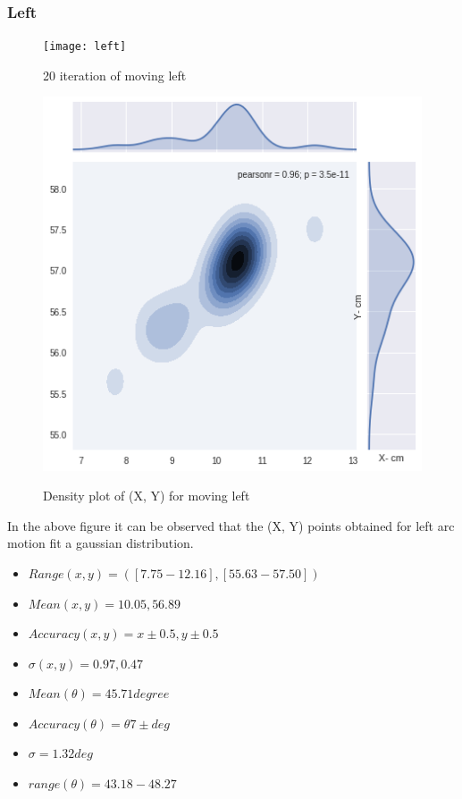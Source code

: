 \documentclass[11pt,a4paper]{article}
\begin{document}
\begin{itemize}
\subsubsection{Left}
\begin{figure}[H]
\centering	
\texttt{[image: left]}
\label{fig:sub1}
\caption{20 iteration of moving left}
\end{figure}

\begin{figure}[H]
\centering	
\includegraphics[width=1.0\linewidth]{leftG}
\label{fig:sub1}
\caption{Density plot of (X, Y) for moving left}
\end{figure}

In the above figure it can be observed that the (X, Y) points obtained for left arc motion fit a gaussian distribution.
\begin{itemize}
\item $ Range (x,y) =([7.75-12.16],[55.63-57.50])  $
\item $ Mean (x, y) = 10.05,56.89$
\item $ Accuracy (x,y) = x \pm0.5 , y \pm0.5  $ 
\item $ \sigma (x, y)= 0.97, 0.47 $
\item $ Mean(\theta) = 45.71 degree$
\item $ Accuracy (\theta)= \theta 7\pm  deg $
\item $ \sigma = 1.32 deg$
\item $ range (\theta) = 43.18 - 48.27 $
\end{itemize}
\end{itemize}
\end{document}
